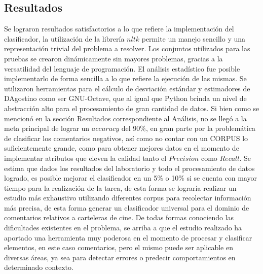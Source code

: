 \documentclass[12pt]{article}
\begin{document}
\subsection{Resultados}
Se lograron resultados satisfactorios a lo que refiere la implementación del clasificador, la utilización de la librería $nltk$ permite un manejo sencillo y una representación trivial del problema a resolver. Los conjuntos utilizados para las pruebas se crearon dinámicamente sin mayores problemas, gracias a la versatilidad del lenguaje de programación.
El análisis estadístico fue posible implementarlo de forma sencilla a lo que refiere la ejecución de las mismas. Se utilizaron herramientas para el cálculo de desviación estándar y estimadores de DAgostino como ser GNU-Octave, que al igual que Python brinda un nivel de abstracción alto para el procesamiento de gran cantidad de datos.
Si bien como se mencionó en la sección Resultados correspondiente al Análisis, no se llegó a la meta principal de lograr un $accuracy$ del 90\%, en gran parte por la problemática de clasificar los comentarios negativos, así como no contar con un CORPUS lo suficientemente grande, como para obtener mejores datos en el momento de implementar atributos que eleven la calidad tanto el $Precision$ como $Recall$.
Se estima que dados los resultados del laboratorio y todo el procesamiento de datos logrado, es posible mejorar el clasificador en un 5\% o 10\% si se cuenta con mayor tiempo para la realización de la tarea, de esta forma se lograría realizar un estudio más exhaustivo utilizando diferentes corpus para recolectar información más precisa, de esta forma generar un clasificador universal para el dominio de comentarios relativos a carteleras de cine. De todas formas conociendo las dificultades existentes en el problema, se arriba a que el estudio realizado ha aportado una herramienta muy poderosa en el momento de procesar y clasificar elementos, en este caso comentarios, pero el mismo puede ser aplicable en diversas áreas, ya sea para detectar errores o predecir comportamientos en determinado contexto.




%
%
\end{document}
